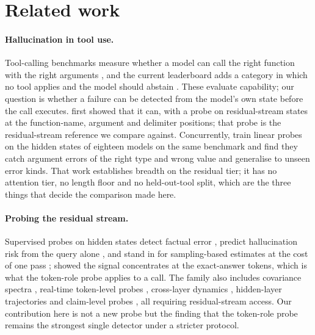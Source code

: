 \section{Related work}
\label{sec:related}

\paragraph{Hallucination in tool use.}
Tool-calling benchmarks measure whether a model can call the right function with the right arguments
\citep{patil2024gorilla,qin2024toolllm,patil2025bfcl}, and the current leaderboard adds a category in which no
tool applies and the model should abstain \citep{patil2025bfcl}. These evaluate capability; our question is
whether a failure can be detected from the model's own state before the call executes.
\citet{healy2026internal} first showed that it can, with a probe on residual-stream states at the
function-name, argument and delimiter positions; that probe is the residual-stream reference we compare
against. Concurrently, \citet{yeats2026calls} train linear probes on the hidden states of eighteen models on
the same benchmark and find they catch argument errors of the right type and wrong value and generalise to
unseen error kinds. That work establishes breadth on the residual tier; it has no attention tier, no length
floor and no held-out-tool split, which are the three things that decide the comparison made here.

\paragraph{Probing the residual stream.}
Supervised probes on hidden states detect factual error \citep{azaria2023internal,marks2024geometry}, predict
hallucination risk from the query alone \citep{ji2024internal}, and stand in for sampling-based estimates at
the cost of one pass \citep{kossen2024sep}; \citet{orgad2025know} showed the signal concentrates at the
exact-answer tokens, which is what the token-role probe applies to a call. The family also includes
covariance spectra \citep{chen2024inside}, real-time token-level probes \citep{obeso2025realtime},
cross-layer dynamics \citep{icrprobe2025}, hidden-layer trajectories \citep{li2025hsad} and claim-level probes
\citep{bhatnagar2026halt}, all requiring residual-stream access. Our contribution here is not a new probe but
the finding that the token-role probe remains the strongest single detector under a stricter protocol.

